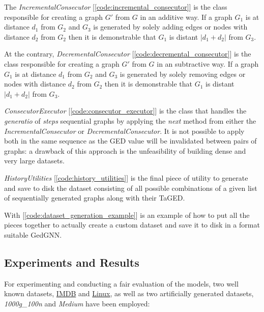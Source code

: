 \documentclass[../Thesis.tex]{subfiles}
\begin{document}
	
	The \textit{IncrementalConsecutor} [\autoref{code:incremental_consecutor}] is the class responsible for creating a graph $G'$ from $G$ in an additive way. If a graph $G_1$ is at distance $d_1$ from $G_2$ and $G_3$ is generated by solely adding edges or nodes with distance $d_2$ from $G_2$ then it is demonstrable that $G_1$ is distant $|d_1 + d_2|$ from $G_3$.
	
	
	At the contrary, \textit{DecrementalConsecutor} [\autoref{code:decremental_consecutor}] is the class responsible for creating a graph $G'$ from $G$ in an subtractive way. If a graph $G_1$ is at distance $d_1$ from $G_2$ and $G_3$ is generated by solely removing edges or nodes with distance $d_2$ from $G_2$ then it is demonstrable that $G_1$ is distant $|d_1 + d_2|$ from $G_3$.
	
	
	\textit{ConsecutorExecutor} [\autoref{code:consecutor_executor}] is the class that handles the \emph{generatio} of \emph{steps} sequential graphs by applying the \emph{next} method from either the \textit{IncrementalConsecutor} or \textit{DecrementalConsecutor}. It is not possible to apply both in the same sequence as the GED value will be invalidated between pairs of graphs: a drawback of this approach is the unfeasibility of building dense and very large datasets.
	
	
	\textit{HistoryUtilities} [\autoref{code:history_utilities}] is the final piece of utility to generate and save to disk the dataset consisting of all possible combinations of a given list of sequentially generated graphs along with their TaGED.  
	
	
	With [\autoref{code:dataset_generation_example}] is an example of how to put all the pieces together to actually create a custom dataset and save it to disk in a format suitable GedGNN.
	
	\subsection{Experiments and Results}
	\label{sec:experiments_results}
	
	For experimenting and conducting a fair evaluation of the models, two well known datasets, \href{https://paperswithcode.com/dataset/imdb-multi}{IMDB} and \href{https://paperswithcode.com/dataset/linux}{Linux}, as well as two artificially generated datasets, \emph{1000g\_100n} and \emph{Medium} have been employed:
	
\end{document}
